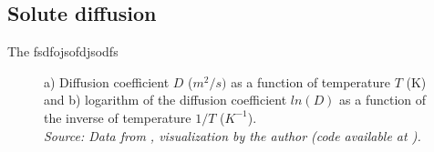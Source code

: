 \subsection{Solute diffusion}

The fsdfojsofdjsodfs

\begin{figure}[h]
 \centering
 \captionsetup{justification=centering}
 \caption{a) Diffusion coefficient $D$ ($m^2/s)$ as a function of temperature $T$ (K) and b) logarithm of the diffusion coefficient $ln(D)$ as a function of the inverse of temperature $1/T$ ($K^{-1}$). \\
 \textit{Source: Data from \citep{kakusan}, visualization by the author (code available at \citep{mygit}).}}
 \label{fig:diffusion}
\end{figure}
